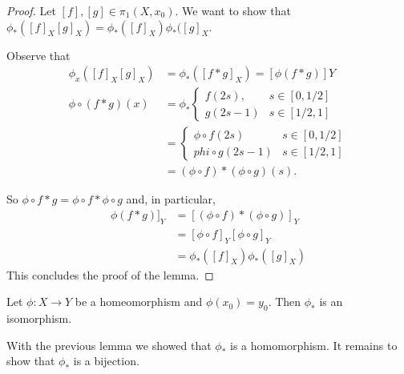 \begin{proof} Let $[f],[g]\in \pi_1(X,x_0).$  We want to show that $\phi_*([f]_X[g]_X)=\phi_*([f]_X)\phi_*([g]_X$.

Observe that
\begin{align*}
\phi_x([f]_X[g]_X) &= \phi_*([f*g]_X)=[\phi(f*g)]Y \\
\phi\circ (f*g)(x) &=\phi_*\begin{cases} f(2s), &s\in [0,1/2]\\ g(2s-1) & s\in [1/2,1] \end{cases}\\
&= \begin{cases} \phi\circ f(2s) & s\in [0,1/2]\\ phi\circ g(2s-1) & s\in [1/2,1]\end{cases}\\
&=(\phi\circ f)*(\phi\circ g)(s).
\end{align*}

So $\phi\circ f * g=\phi\circ f * \phi\circ g$ and, in particular, 
\begin{align*}
 \phi(f*g)]_Y  &= [(\phi\circ f)*(\phi\circ g)]_Y\\ 
 		& =[\phi\circ f]_Y[\phi\circ g]_Y\\
		& =\phi_*([f]_X)\phi_*([g]_X)
\end{align*}
This concludes the proof of the lemma.
\end{proof}

\begin{theorem}
Let $\phi:X\to Y$ be a homeomorphism and $\phi(x_0)=y_0$.  Then $\phi_*$ is an isomorphism.
\end{theorem}

With the previous lemma we showed that $\phi_*$ is a homomorphism.  It remains to show that $\phi_*$ is a bijection.

